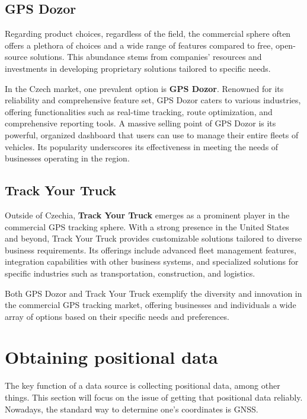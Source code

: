 \documentclass[FM,BP,EN,fonts]{tulthesis}
\begin{document}
\subsection{GPS Dozor}
Regarding product choices, regardless of the field, the commercial sphere often offers a plethora of choices and a wide range of features compared to free, open-source solutions. This abundance stems from companies' resources and investments in developing proprietary solutions tailored to specific needs.

In the Czech market, one prevalent option is \textbf{GPS Dozor}. Renowned for its reliability and comprehensive feature set, GPS Dozor caters to various industries, offering functionalities such as real-time tracking, route optimization, and comprehensive reporting tools. A massive selling point of GPS Dozor is its powerful, organized dashboard that users can use to manage their entire fleets of vehicles. Its popularity underscores its effectiveness in meeting the needs of businesses operating in the region.


\subsection{Track Your Truck}
Outside of Czechia, \textbf{Track Your Truck} emerges as a prominent player in the commercial GPS tracking sphere. With a strong presence in the United States and beyond, Track Your Truck provides customizable solutions tailored to diverse business requirements. Its offerings include advanced fleet management features, integration capabilities with other business systems, and specialized solutions for specific industries such as transportation, construction, and logistics.

Both GPS Dozor and Track Your Truck exemplify the diversity and innovation in the commercial GPS tracking market, offering businesses and individuals a wide array of options based on their specific needs and preferences.

\section{Obtaining positional data}
The key function of a data source is collecting positional data, among other things. This section will focus on the issue of getting that positional data reliably. Nowadays, the standard way to determine one's coordinates is GNSS.
\end{document}
